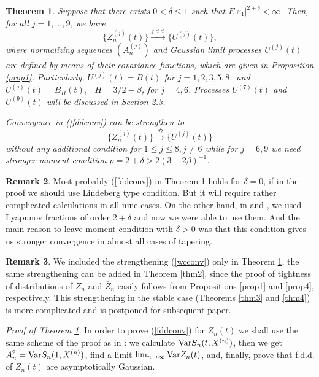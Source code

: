 \documentclass[12pt]{article}
\def\b{\beta}
\def\d{\delta}
\def\e{\varepsilon}
\def\cd{{\mathscr D}}
\def\wc{\stackrel{\cd}{\longrightarrow}}
\def\fdd{\stackrel{f.d.d.}{\longrightarrow}}
\theoremstyle{plain}
\newtheorem{teo}{Theorem}
\theoremstyle{definition}
\newtheorem{remark}[teo]{Remark}
\begin{document}
\begin{teo}\label{thm1} Suppose that   there exists $0<\d\le 1$ such that $E|\e_1|^{2+\d}<\infty$. Then, for all $j=1,\dots , 9$, we have
\begin{equation}\label{fddconv}
\{Z_n^{(j)}(t)\}\fdd \{U^{(j)}(t)\},
\end{equation}
where normalizing sequences $(A_n^{(j)})$ and Gaussian limit processes $U^{(j)}(t)$ are  defined by means of their covariance functions, which  are given in Proposition \ref{prop1}. Particularly, $U^{(j)}(t)=B(t)$ for $j=1, 2, 3,5, 8,$ and $U^{(j)}(t)=B_H(t)$, \ $H=3/2-\b$,  for   $j=4, 6$. Processes $U^{(7)}(t)$ and $U^{(9)}(t)$ will be discussed in Section 2.3.

Convergence in (\ref{fddconv}) can be strengthen to
\begin{equation}\label{wcconv}
\{Z_n^{(j)}(t)\}\wc \{U^{(j)}(t)\}
\end{equation}
without any additional condition for $1\le j \le 8, j\ne 6$ while for $j=6, 9$ we need stronger moment condition $p=2+\d>2(3-2\b)^{-1}$.
\end{teo}
\begin{remark}\label{rem1} Most probably (\ref{fddconv}) in Theorem \ref{thm1} holds for $\d=0$, if in the proof we should use Lindeberg type condition. But it will require rather complicated calculations in all nine cases. On the other  hand, in \cite{Paul21} and \cite{Paul22},
 we used Lyapunov fractions of order $2+\d$ and now we were able to use them. And the main reason to leave moment condition with $\d>0$ was that this condition gives us stronger convergence in almost all cases of tapering.
\end{remark}

\begin{remark}\label{rem2} We included the strengthening (\ref{wcconv}) only in Theorem \ref{thm1}, the same strengthening can be added in Theorem \ref{thm2}, since the proof of tightness of distributions of $Z_n$ and ${\bar Z}_n$ easily follows from Propositions \ref{prop1} and \ref{prop4}, respectively. This strengthening in the stable case (Theorems \ref{thm3} and \ref{thm4}) is more complicated and is postponed for subsequent paper.
\end{remark}


{\it Proof of Theorem \ref{thm1}}.
In order to prove (\ref{fddconv}) for $Z_n(t)$ we shall use the same scheme of the proof as in \cite{Paul21}: we calculate ${\rm Var}S_n(t, X^{(n)})$, then we get $A_n^2={\rm Var}S_n(1, X^{(n)})$,  find a limit $\lim_{n\to \infty}{\rm Var}Z_n(t)$, and, finally, prove that f.d.d. of $Z_n(t)$ are asymptotically Gaussian.
\end{document}
